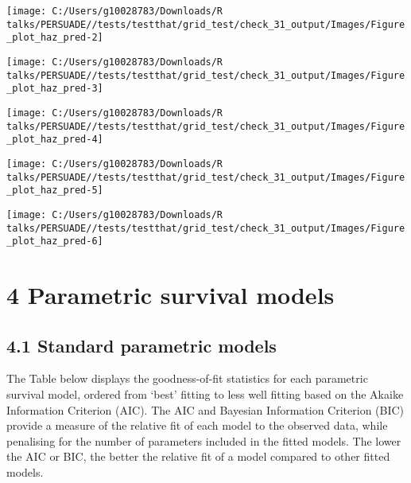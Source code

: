 \documentclass[
]{article}
\begin{document}
\begin{flushleft}\texttt{[image: C:/Users/g10028783/Downloads/R talks/PERSUADE//tests/testthat/grid\_test/check\_31\_output/Images/Figure\_plot\_haz\_pred-2]} \end{flushleft}

\begin{flushleft}\texttt{[image: C:/Users/g10028783/Downloads/R talks/PERSUADE//tests/testthat/grid\_test/check\_31\_output/Images/Figure\_plot\_haz\_pred-3]} \end{flushleft}

\begin{flushleft}\texttt{[image: C:/Users/g10028783/Downloads/R talks/PERSUADE//tests/testthat/grid\_test/check\_31\_output/Images/Figure\_plot\_haz\_pred-4]} \end{flushleft}

\begin{flushleft}\texttt{[image: C:/Users/g10028783/Downloads/R talks/PERSUADE//tests/testthat/grid\_test/check\_31\_output/Images/Figure\_plot\_haz\_pred-5]} \end{flushleft}

\begin{flushleft}\texttt{[image: C:/Users/g10028783/Downloads/R talks/PERSUADE//tests/testthat/grid\_test/check\_31\_output/Images/Figure\_plot\_haz\_pred-6]} \end{flushleft}

\clearpage

\section{4 Parametric survival models}\label{parametric-survival-models}

\subsection{4.1 Standard parametric
models}\label{standard-parametric-models}

The Table below displays the goodness-of-fit statistics for each
parametric survival model, ordered from `best' fitting to less well
fitting based on the Akaike Information Criterion (AIC). The AIC and
Bayesian Information Criterion (BIC) provide a measure of the relative
fit of each model to the observed data, while penalising for the number
of parameters included in the fitted models. The lower the AIC or BIC,
the better the relative fit of a model compared to other fitted models.
\end{document}
